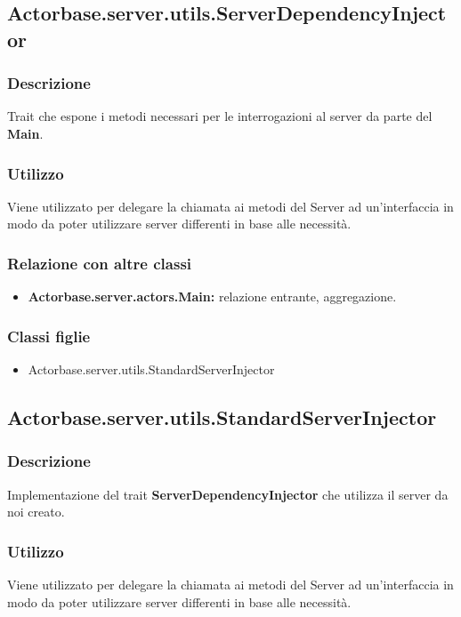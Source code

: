 \documentclass[a4paper]{article}
\begin{document}
		\subsection{Actorbase.server.utils.ServerDependencyInjector}
			\subsubsection{Descrizione}
				Trait che espone i metodi necessari per le interrogazioni al server da parte del \textbf{Main}.
				
			\subsubsection{Utilizzo}
				Viene utilizzato per delegare la chiamata ai metodi del Server ad un'interfaccia in modo da poter utilizzare server differenti in base 
				alle necessità.
				
			\subsubsection{Relazione con altre classi}
				\begin{itemize}
					\item \textbf{Actorbase.server.actors.Main:} relazione entrante, aggregazione.
				\end{itemize}
				
			\subsubsection{Classi figlie}
				\begin{itemize}
					\item Actorbase.server.utils.StandardServerInjector
				\end{itemize}
		
		\subsection{Actorbase.server.utils.StandardServerInjector}
			\subsubsection{Descrizione}
				Implementazione del trait \textbf{ServerDependencyInjector} che utilizza il server da noi creato.
				
			\subsubsection{Utilizzo}
				Viene utilizzato per delegare la chiamata ai metodi del Server ad un'interfaccia in modo da poter utilizzare server differenti in base 
				alle necessità.				
				
\end{document}
